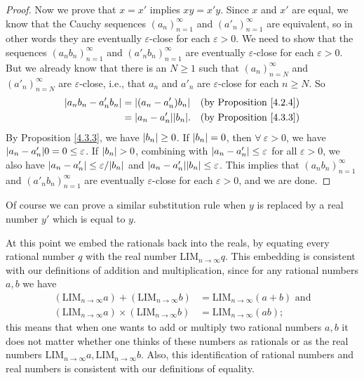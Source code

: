 \begin{proof}
    Now we prove that \(x = x'\) implies \(xy = x'y\).
    Since \(x\) and \(x'\) are equal, we know that the Cauchy sequences \((a_n)_{n = 1}^{\infty}\) and \((a'_n)_{n = 1}^{\infty}\) are equivalent, so in other words they are eventually \(\varepsilon\)-close for each \(\varepsilon > 0\).
    We need to show that the sequences \((a_n b_n)_{n = 1}^{\infty}\) and \((a'_n b_n)_{n = 1}^{\infty}\) are eventually \(\varepsilon\)-close for each \(\varepsilon > 0\).
    But we already know that there is an \(N \geq 1\) such that \((a_n)_{n = N}^{\infty}\) and \((a'_n)_{n = N}^{\infty}\) are \(\varepsilon\)-close, i.e., that \(a_n\) and \(a'_n\) are \(\varepsilon\)-close for each \(n \geq N\).
    So
    \begin{align*}
        \abs*{a_n b_n - a'_n b_n} & = \abs*{(a_n - a'_n)b_n}       & \text{(by Proposition \ref{4.2.4})} \\
                                  & = \abs*{a_n - a'_n}\abs*{b_n}. & \text{(by Proposition \ref{4.3.3})}
    \end{align*}
    By Proposition \ref{4.3.3}, we have \(\abs*{b_n} \geq 0\).
    If \(\abs*{b_n} = 0\), then \(\forall\ \varepsilon > 0\), we have \(\abs*{a_n - a'_n} 0 = 0 \leq \varepsilon\).
    If \(\abs*{b_n} > 0\), combining with \(\abs*{a_n - a'_n} \leq \varepsilon\) for all \(\varepsilon > 0\), we also have \(\abs*{a_n - a'_n} \leq \varepsilon / \abs*{b_n}\) and \(\abs*{a_n - a'_n}\abs*{b_n} \leq \varepsilon\).
    This implies that \((a_n b_n)_{n = 1}^{\infty}\) and \((a'_n b_n)_{n = 1}^{\infty}\) are eventually \(\varepsilon\)-close for each \(\varepsilon > 0\), and we are done.
\end{proof}

\begin{note}
    Of course we can prove a similar substitution rule when \(y\) is replaced by a real number \(y'\) which is equal to \(y\).
\end{note}

\begin{note}
    At this point we embed the rationals back into the reals, by equating every rational number \(q\) with the real number \(\text{LIM}_{n \to \infty} q\).
    This embedding is consistent with our definitions of addition and multiplication, since for any rational numbers \(a, b\) we have
    \begin{align*}
        (\text{LIM}_{n \to \infty} a) + (\text{LIM}_{n \to \infty} b)      & = \text{LIM}_{n \to \infty} (a + b) \text{ and} \\
        (\text{LIM}_{n \to \infty} a) \times (\text{LIM}_{n \to \infty} b) & = \text{LIM}_{n \to \infty} (ab);
    \end{align*}
    this means that when one wants to add or multiply two rational numbers \(a, b\) it does not matter whether one thinks of these numbers as rationals or as the real numbers \(\text{LIM}_{n \to \infty} a, \text{LIM}_{n \to \infty} b\).
    Also, this identification of rational numbers and real numbers is consistent with our definitions of equality.
\end{note}

